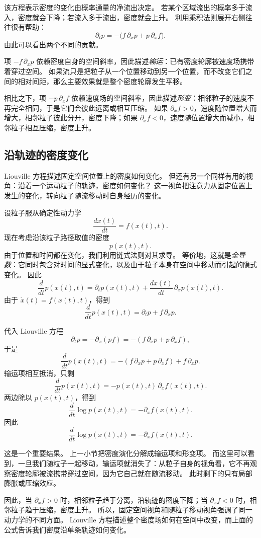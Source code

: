 该方程表示密度的变化由概率通量的净流出决定。
若某个区域流出的概率多于流入，密度就会下降；若流入多于流出，密度就会上升。
利用乘积法则展开右侧往往很有帮助：
\[
\partial_t p
=
-\bigl(f\,\partial_x p + p\,\partial_x f\bigr).
\]
由此可以看出两个不同的贡献。

项 $-f\,\partial_x p$ 依赖密度自身的空间斜率，因此描述\emph{输运}：已有密度轮廓被速度场携带着穿过空间。
如果流只是把粒子从一个位置移动到另一个位置，而不改变它们之间的相对间距，那么主要效果就是整个密度轮廓发生平移。

相比之下，项 $-p\,\partial_x f$ 依赖速度场的空间斜率，因此描述\emph{形变}：相邻粒子的速度不再完全相同，于是它们会彼此远离或相互压缩。
如果 $\partial_x f>0$，速度随位置增大而增大，相邻粒子彼此分开，密度下降；如果 $\partial_x f<0$，速度随位置增大而减小，相邻粒子相互压缩，密度上升。

\subsection{沿轨迹的密度变化}

Liouville 方程描述固定空间位置上的密度如何变化。
但还有另一个同样有用的视角：沿着一个运动粒子的轨迹，密度如何变化？
这一视角把注意力从固定位置上发生的变化，转向粒子随流移动时自身经历的变化。

设粒子服从确定性动力学
\[
\frac{dx(t)}{dt}=f(x(t),t).
\]
现在考虑沿该粒子路径取值的密度
\[
p(x(t),t).
\]
由于位置和时间都在变化，我们利用链式法则对其求导。
等价地，这就是\emph{全导数}：它同时包含对时间的显式变化，以及由于粒子本身在空间中移动而引起的隐式变化。
因此
\[
\frac{d}{dt}p(x(t),t)
=
\partial_t p(x(t),t)
+
\frac{dx(t)}{dt}\,\partial_x p(x(t),t).
\]
由于 $\dot{x}(t)=f(x(t),t)$，得到
\[
\frac{d}{dt}p(x(t),t)
=
\partial_t p + f\,\partial_x p.
\]

代入 Liouville 方程
\[
\partial_t p
=
-\partial_x(pf)
=
-(f\,\partial_x p + p\,\partial_x f),
\]
于是
\[
\frac{d}{dt}p(x(t),t)
=
-(f\,\partial_x p + p\,\partial_x f)+f\,\partial_x p.
\]
输运项相互抵消，只剩
\[
\frac{d}{dt}p(x(t),t)
=
-p(x(t),t)\,\partial_x f(x(t),t).
\]
两边除以 $p(x(t),t)$，得到
\[
\frac{d}{dt}\log p(x(t),t)
=
-\partial_x f(x(t),t).
\]
因此
\[
\boxed{
\frac{d}{dt}\log p(x(t),t)
=
-\partial_x f(x(t),t).
}
\]

这是一个重要结果。
上一小节把密度演化分解成输运项和形变项。
而这里可以看到，一旦我们随粒子一起移动，输运项就消失了：从粒子自身的视角看，它不再观察密度轮廓被流携带穿过空间，因为它自己就在随流移动。
此时剩下的只有局部膨胀或压缩效应。

因此，当 $\partial_x f>0$ 时，相邻粒子趋于分离，沿轨迹的密度下降；当 $\partial_x f<0$ 时，相邻粒子趋于压缩，密度上升。
所以，固定空间视角和随粒子移动视角强调了同一动力学的不同方面。
Liouville 方程描述整个密度场如何在空间中改变，而上面的公式告诉我们密度沿单条轨迹如何变化。

